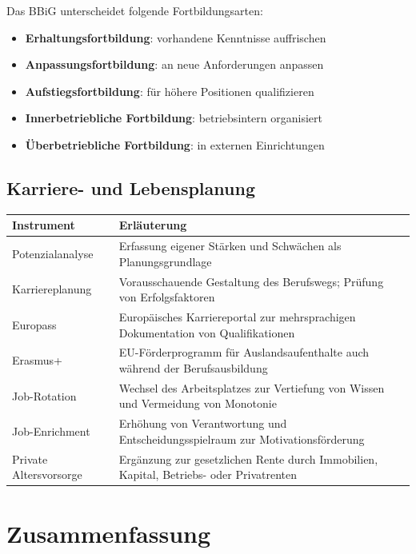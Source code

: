 \documentclass[11pt, a4paper]{article}
\begin{document}
Das BBiG unterscheidet folgende Fortbildungsarten:
\begin{itemize}
  \item \textbf{Erhaltungsfortbildung}: vorhandene Kenntnisse auffrischen
  \item \textbf{Anpassungsfortbildung}: an neue Anforderungen anpassen
  \item \textbf{Aufstiegsfortbildung}: für höhere Positionen qualifizieren
  \item \textbf{Innerbetriebliche Fortbildung}: betriebsintern organisiert
  \item \textbf{Überbetriebliche Fortbildung}: in externen Einrichtungen
\end{itemize}

\subsection{Karriere- und Lebensplanung}

\begin{center}
\begin{tabular}{p{4cm} p{9cm}}
\toprule
\textbf{Instrument} & \textbf{Erläuterung}\\
\midrule
Potenzialanalyse & Erfassung eigener Stärken und Schwächen als Planungsgrundlage\\
Karriereplanung & Vorausschauende Gestaltung des Berufswegs; Prüfung von Erfolgsfaktoren\\
Europass & Europäisches Karriereportal zur mehrsprachigen Dokumentation von Qualifikationen\\
Erasmus+ & EU-Förderprogramm für Auslandsaufenthalte auch während der Berufsausbildung\\
Job-Rotation & Wechsel des Arbeitsplatzes zur Vertiefung von Wissen und Vermeidung von Monotonie\\
Job-Enrichment & Erhöhung von Verantwortung und Entscheidungsspielraum zur Motivationsförderung\\
Private Altersvorsorge & Ergänzung zur gesetzlichen Rente durch Immobilien, Kapital, Betriebs- oder Privatrenten\\
\bottomrule
\end{tabular}
\end{center}

\section{Zusammenfassung}
\end{document}
